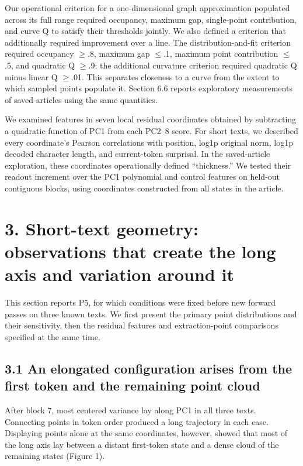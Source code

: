 Our operational criterion for a one-dimensional graph approximation populated across its full range required occupancy, maximum gap, single-point contribution, and curve Q to satisfy their thresholds jointly. We also defined a criterion that additionally required improvement over a line. The distribution-and-fit criterion required occupancy {\(\geq\).8,} maximum gap {\(\leq\).1,} maximum point contribution {\(\leq\).5,} and quadratic Q {\(\geq\).9;} the additional curvature criterion required quadratic Q minus linear Q {\(\geq\).01.} This separates closeness to a curve from the extent to which sampled points populate it. Section 6.6 reports exploratory measurements of saved articles using the same quantities.

We examined features in seven local residual coordinates obtained by subtracting a quadratic function of PC1 from each PC2--8 score. For short texts, we described every coordinate's Pearson correlations with position, log1p original norm, log1p decoded character length, and current-token surprisal. In the saved-article exploration, these coordinates operationally defined ``thickness.'' We tested their readout increment over the PC1 polynomial and control features on held-out contiguous blocks, using coordinates constructed from all states in the article.

\FloatBarrier

\section{3. Short-text geometry: observations that create the long axis and variation around it}\label{short-text-geometry-observations-that-create-the-long-axis-and-variation-around-it}

This section reports P5, for which conditions were fixed before new forward passes on three known texts. We first present the primary point distributions and their sensitivity, then the residual features and extraction-point comparisons specified at the same time.

\FloatBarrier

\subsection{3.1 An elongated configuration arises from the first token and the remaining point cloud}\label{an-elongated-configuration-arises-from-the-first-token-and-the-remaining-point-cloud}

After block 7, most centered variance lay along PC1 in all three texts. Connecting points in token order produced a long trajectory in each case. Displaying points alone at the same coordinates, however, showed that most of the long axis lay between a distant first-token state and a dense cloud of the remaining states (Figure 1).


